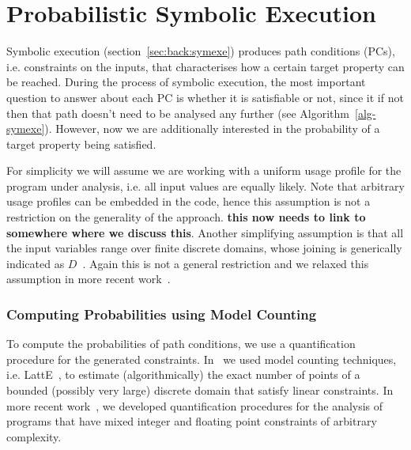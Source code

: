 \section{Probabilistic Symbolic Execution}
\label{sec:pse}


Symbolic execution (section~\ref{sec:back:symexe}) produces path conditions (PCs), i.e. constraints on the inputs, that characterises how a certain target property can be reached. During the process of symbolic execution, the most important question to answer about each PC is whether it is satisfiable or not, since it if not then that path doesn't need to be analysed any further (see Algorithm~\ref{alg-symexe}).  However, now we are additionally interested in the probability of a target property being satisfied. 

For simplicity we will assume we are working with a uniform usage profile for the program under analysis, i.e. all input values are equally likely. Note that arbitrary usage profiles can be embedded in the code, hence this assumption is not a restriction on the generality of the approach. {\bf this now needs to link to somewhere where we discuss this}. Another simplifying assumption is that all the input variables range over finite discrete domains, whose joining is generically indicated as $D$~\cite{filieri-etal-icse2013}. Again this is not a general restriction and we relaxed this assumption in more recent work~\cite{Borges2014PLDI}.

\subsubsection{Computing Probabilities using Model Counting} 
To compute the probabilities of path conditions, we use a
quantification procedure for the generated constraints.
In~\cite{filieri-etal-icse2013} we used model counting techniques,
i.e. LattE~\cite{deLoera-etal-2012}, to estimate (algorithmically) the exact
number of points of a bounded (possibly very large) discrete domain
that satisfy linear constraints.  In more recent work~\cite{Borges2014PLDI},  
we developed quantification procedures for
the analysis of programs that have mixed integer and floating point
constraints of arbitrary complexity.

